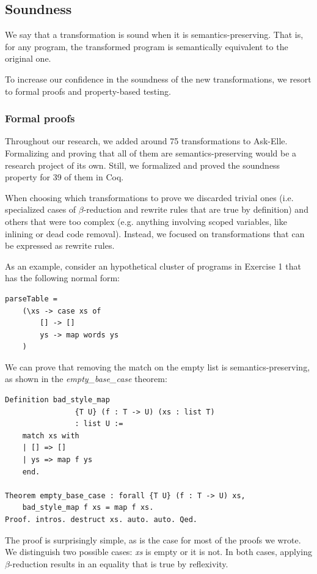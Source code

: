 \subsection{Soundness}

We say that a transformation is sound when it is semantics-preserving. That is, for any program, the transformed program is semantically equivalent to the original one.

To increase our confidence in the soundness of the new transformations, we resort to formal proofs and property-based testing.

\subsubsection{Formal proofs}

Throughout our research, we added around 75 transformations to Ask-Elle. Formalizing and proving that all of them are semantics-preserving would be a research project of its own. Still, we formalized and proved the soundness property for 39 of them in Coq.

When choosing which transformations to prove we discarded trivial ones (i.e. specialized cases of $\beta$-reduction and rewrite rules that are true by definition) and others that were too complex (e.g. anything involving scoped variables, like inlining or dead code removal). Instead, we focused on transformations that can be expressed as rewrite rules.

As an example, consider an hypothetical cluster of programs in Exercise 1 that has the following normal form:

\begin{verbatim}
parseTable =
    (\xs -> case xs of
        [] -> []
        ys -> map words ys
    )
\end{verbatim}

We can prove that removing the match on the empty list is semantics-preserving, as shown in the \emph{empty\_base\_case} theorem:

\begin{verbatim}
Definition bad_style_map
                {T U} (f : T -> U) (xs : list T)
                : list U :=
    match xs with
    | [] => []
    | ys => map f ys
    end.

Theorem empty_base_case : forall {T U} (f : T -> U) xs,
    bad_style_map f xs = map f xs.
Proof. intros. destruct xs. auto. auto. Qed.
\end{verbatim}

The proof is surprisingly simple, as is the case for most of the proofs we wrote. We distinguish two possible cases: \emph{xs} is empty or it is not. In both cases, applying $\beta$-reduction results in an equality that is true by reflexivity.

